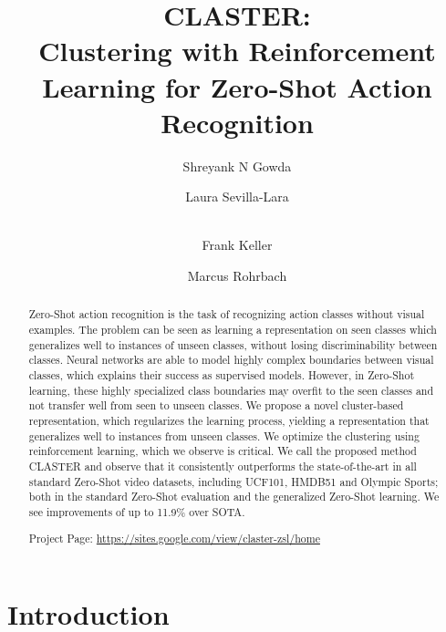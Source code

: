 \documentclass[runningheads]{llncs}
\begin{document}
\providecommand{\MethodName}{CLASTER\xspace}
 \makeatletter\newcommand{}\makeatother
\pagestyle{headings}
\mainmatter
\def\ECCVSubNumber{3591}  

\title{CLASTER:\\Clustering with Reinforcement Learning for Zero-Shot Action Recognition} 



\author{Shreyank N Gowda \and
Laura Sevilla-Lara  \and \\
Frank Keller \and
Marcus Rohrbach}


\maketitle

\begin{abstract}
Zero-Shot action recognition is the task of recognizing action classes without visual examples. The problem can be seen as learning a representation
on seen classes which generalizes well to instances of unseen classes, without losing discriminability between classes. Neural networks are able to model highly complex boundaries between visual classes, which explains their success as supervised models.
However, in Zero-Shot learning, these highly specialized class boundaries may overfit to the seen classes and not transfer well from seen to unseen classes. We propose a  novel cluster-based representation, which regularizes the learning process, yielding a representation that
generalizes well to instances from unseen classes. 
We optimize the clustering using reinforcement learning, which we observe is critical. We call the proposed method \MethodName and observe that it consistently outperforms the state-of-the-art in all standard Zero-Shot video datasets, including UCF101, HMDB51 and Olympic Sports; both in the standard Zero-Shot evaluation and the generalized Zero-Shot learning. We see improvements of up to 11.9\% over SOTA. 

Project Page: \url{https://sites.google.com/view/claster-zsl/home}
\end{abstract}

\section{Introduction}
\end{document}
